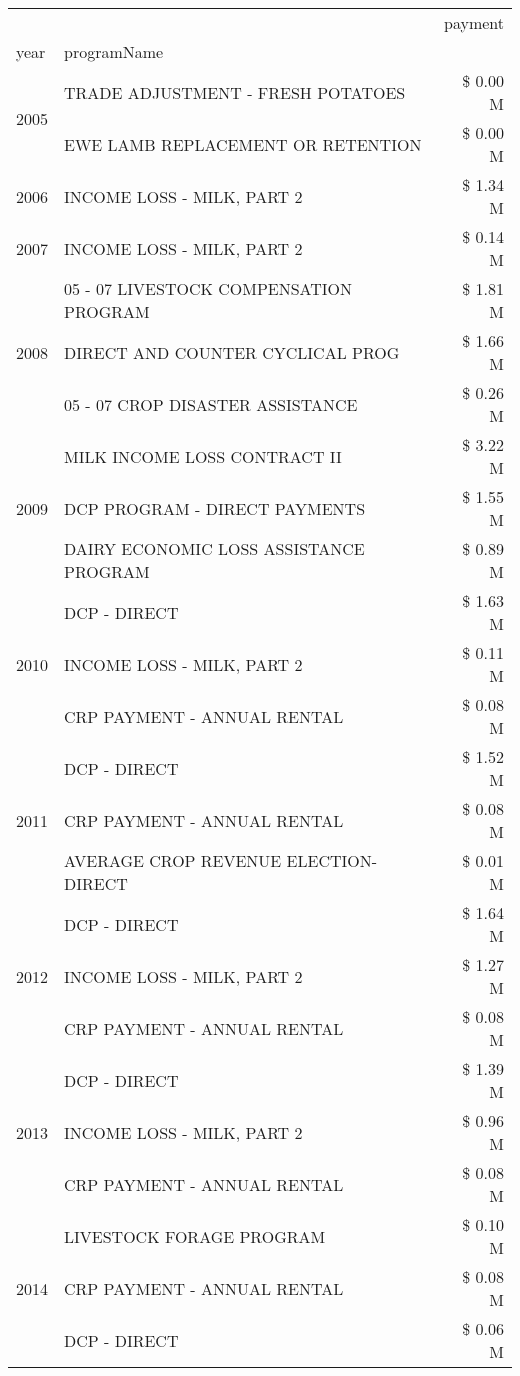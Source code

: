 \begin{tabular}{llr}
\toprule
 &  & payment \\
year & programName &  \\
\midrule
\multirow[t]{2}{*}{2005} & TRADE ADJUSTMENT - FRESH POTATOES & \$ 0.00 M \\
 & EWE LAMB REPLACEMENT OR RETENTION & \$ 0.00 M \\
\cline{1-3}
2006 & INCOME LOSS - MILK, PART 2 & \$ 1.34 M \\
\cline{1-3}
2007 & INCOME LOSS - MILK, PART 2 & \$ 0.14 M \\
\cline{1-3}
\multirow[t]{3}{*}{2008} & 05 - 07 LIVESTOCK COMPENSATION PROGRAM & \$ 1.81 M \\
 & DIRECT AND COUNTER CYCLICAL PROG & \$ 1.66 M \\
 & 05 - 07 CROP DISASTER ASSISTANCE & \$ 0.26 M \\
\cline{1-3}
\multirow[t]{3}{*}{2009} & MILK INCOME LOSS CONTRACT II & \$ 3.22 M \\
 & DCP PROGRAM - DIRECT PAYMENTS & \$ 1.55 M \\
 & DAIRY ECONOMIC LOSS ASSISTANCE PROGRAM & \$ 0.89 M \\
\cline{1-3}
\multirow[t]{3}{*}{2010} & DCP - DIRECT & \$ 1.63 M \\
 & INCOME LOSS - MILK, PART 2 & \$ 0.11 M \\
 & CRP PAYMENT - ANNUAL RENTAL & \$ 0.08 M \\
\cline{1-3}
\multirow[t]{3}{*}{2011} & DCP - DIRECT & \$ 1.52 M \\
 & CRP PAYMENT - ANNUAL RENTAL & \$ 0.08 M \\
 & AVERAGE CROP REVENUE ELECTION-DIRECT & \$ 0.01 M \\
\cline{1-3}
\multirow[t]{3}{*}{2012} & DCP - DIRECT & \$ 1.64 M \\
 & INCOME LOSS - MILK, PART 2 & \$ 1.27 M \\
 & CRP PAYMENT - ANNUAL RENTAL & \$ 0.08 M \\
\cline{1-3}
\multirow[t]{3}{*}{2013} & DCP - DIRECT & \$ 1.39 M \\
 & INCOME LOSS - MILK, PART 2 & \$ 0.96 M \\
 & CRP PAYMENT - ANNUAL RENTAL & \$ 0.08 M \\
\cline{1-3}
\multirow[t]{3}{*}{2014} & LIVESTOCK FORAGE PROGRAM & \$ 0.10 M \\
 & CRP PAYMENT - ANNUAL RENTAL & \$ 0.08 M \\
 & DCP - DIRECT & \$ 0.06 M \\

\end{tabular}
